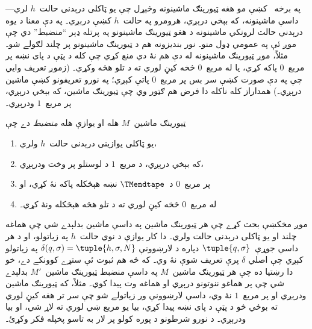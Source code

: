\documentclass[../../../include/open-logic-section]{subfiles}
\begin{document}

\begin{explain}
په برخه~ کښې مو هغه ټيورينګ ماشينونه وڅېړل چې يو
ټاکلی درېدنی حالت~$h$ لري---داسې ماشينونه، که بېخي درېږي، هرومرو په
حالت~$h$ کښې درېږي۔ په دې معنا د يوه درېدني حالت لرونکي ماشينونه د
هغو ټيورينګ ماشينونو په پرتله ډېر ``منضبط'' دي چې موږ ئې په عمومي
ډول منو۔ نور بنديزونه هم د ټيورينګ ماشينونو پر چلند لګولے شو۔ مثلاً،
موږ ټيورينګ ماشينونه له دې هم نۀ دي منع کړي چې کله د پټې د پای نښه
پر مربع~$0$ پاکه کړي، يا له مربع~$0$ څخه کيڼ لوري ته د تلو هڅه وکړي۔
(زموږ تعريف وايي چې په دې صورت کښې سر بس پر مربع~$0$ پاتې کېږي؛ په
نورو تعريفونو کښې ماشين درېږي۔) همداراز کله ناکله دا فرض هم ګټور وي
چې ټيورينګ ماشين، که بېخي درېږي، پر مربع~$1$ ودرېږي۔
\end{explain}

\begin{defn}
ټيورينګ ماشين~$M$ هله او يوازې هله \emph{منضبط} دے چې
\begin{enumerate}
    \item يو ټاکلی يوازينی درېدنی حالت~$h$ ولري،
    \item که بېخي درېږي، د مربع~$1$ د لوستلو پر وخت ودرېږي،
    \item پر مربع~$0$ د~$\TMendtape$ نښه هېڅکله پاکه نۀ کړي، او
    \item له مربع~$0$ څخه کيڼ لوري ته د تلو هڅه هېڅکله ونۀ کړي۔
\end{enumerate}
\end{defn}

\begin{explain}
موږ مخکښې بحث کړے چې هر ټيورينګ ماشين په داسې ماشين بدلېدے شي چې
هماغه چلند او يو ټاکلی درېدنی حالت ولري۔ دا کار يوازې د نوي حالت~$h$
په زياتولو، او د هر داسې جوړې~$\tuple{q,\sigma}$ دپاره د لارښوونې
$\delta(q, \sigma) = \tuple{h, \sigma, N}$ په زياتولو کېږي چې اصلي
$\delta$ پرې تعريف شوې نۀ وي۔ که څه هم ثبوت ئې ستړے کوونکے دے، خو
دا رښتيا ده چې هر ټيورينګ ماشين~$M$ په داسې منضبط ټيورينګ ماشين~$M'$
بدلېدے شي چې پر هماغو ننوتونو درېږي او هماغه وت پيدا کوي۔ مثلاً، که
ټيورينګ ماشين ودرېږي او پر مربع~$1$ نۀ وي، داسې لارښوونې ور زياتولے
شو چې سر تر هغه کيڼ لوري ته بوځي څو د پټې د پای نښه پيدا کړي، بيا يو
مربع ښي لوري ته لاړ شي، او بيا ودرېږي۔ د نورو شرطونو د پوره کولو پر
لار به تاسو پخپله فکر وکړئ۔
\end{explain}
\end{document}
